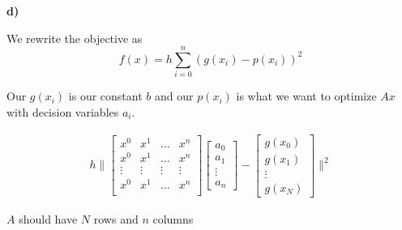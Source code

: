 \textbf{d)}

\answer

We rewrite the objective as
\[
	f(x) = h \sum_{i=0}^n (g(x_i) - p(x_i))^2
\]

Our $g(x_i)$ is our constant $b$ and our $p(x_i)$ is what we want to optimize $Ax$ with decision variables $a_i$.

\begin{align*}
	h \|
	\begin{bmatrix}
		x^0 & x^1 & \ldots & x^n \\
		x^0 & x^1 & \ldots & x^n \\
		\vdots & \vdots & \vdots & \vdots\\
		x^0 & x^1 & \ldots & x^n \\
	\end{bmatrix}\begin{bmatrix}
		a_0 \\ a_1 \\ \vdots \\ a_n
	\end{bmatrix} - \begin{bmatrix}
		g(x_0) \\ g(x_1) \\ \vdots \\ g(x_N)
	\end{bmatrix}
	\|^2
\end{align*}

$A$ should have $N$ rows and $n$ columns





































